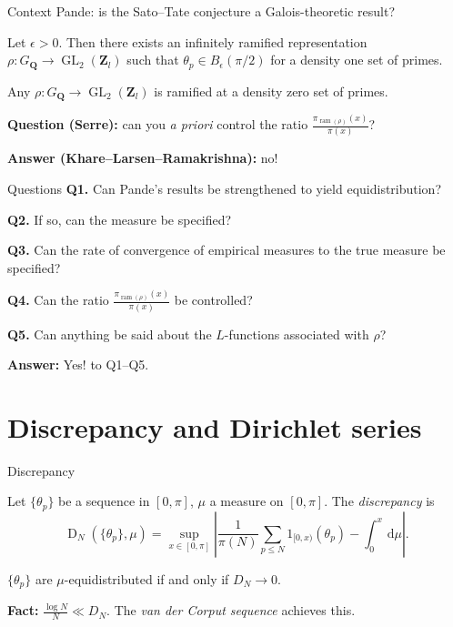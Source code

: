 \documentclass[handout]{beamer}
\DeclareMathOperator{\D}{D}
\DeclareMathOperator{\GL}{GL}
\DeclareMathOperator{\ram}{ram}
\newcommand{\bQ}{\mathbf{Q}}
\newcommand{\bZ}{\mathbf{Z}}
\newcommand{\dd}{\mathrm{d}}
\begin{document}
\begin{frame}{Context}
Pande: is the Sato--Tate conjecture a Galois-theoretic result?
\pause

\begin{theorem}[Pande]
Let $\epsilon>0$. Then there exists an infinitely ramified representation 
$\rho\colon G_\bQ \to \GL_2(\bZ_l)$ such that $\theta_p\in B_\epsilon(\pi/2)$ 
for a density one set of primes. 
\end{theorem}
\pause

\begin{theorem}
Any $\rho\colon G_\bQ \to \GL_2(\bZ_l)$ is ramified at a density zero set of 
primes. 
\end{theorem}
\pause

\textbf{Question (Serre):} can you \emph{a priori} control the ratio 
$\frac{\pi_{\ram(\rho)}(x)}{\pi(x)}$?
\pause

\textbf{Answer (Khare--Larsen--Ramakrishna):} no!
\end{frame}


\begin{frame}{Questions}
\textbf{Q1.} Can Pande's results be strengthened to yield equidistribution? 
\pause

\textbf{Q2.} If so, can the measure be specified?
\pause

\textbf{Q3.} Can the rate of convergence of empirical measures to the true measure 
be specified?

\textbf{Q4.} Can the ratio $\frac{\pi_{\ram(\rho)}(x)}{\pi(x)}$ be controlled?
\pause

\textbf{Q5.} Can anything be said about the $L$-functions associated with $\rho$?
\pause

\textbf{Answer:} Yes! to Q1--Q5. 
\end{frame}





\section{Discrepancy and Dirichlet series}


\begin{frame}{Discrepancy}
\begin{definition}
Let $\{\theta_p\}$ be a sequence in $[0,\pi]$, $\mu$ a measure on $[0,\pi]$. 
The \emph{discrepancy} is 
\[
	\D_N(\{\theta_p\},\mu) =  \sup_{x\in [0,\pi]}\left| \frac{1}{\pi(N)} \sum_{p\leqslant N} 1_{[0,x)}(\theta_p) - \int_0^x \, \dd\mu\right| .
\]
\end{definition}
\pause

$\{\theta_p\}$ are $\mu$-equidistributed if and only if $D_N \to 0$. 
\pause

\textbf{Fact:}
$\frac{\log N}{N} \ll D_N$. The \emph{van der Corput sequence} achieves this. 
\end{frame}
\end{document}
